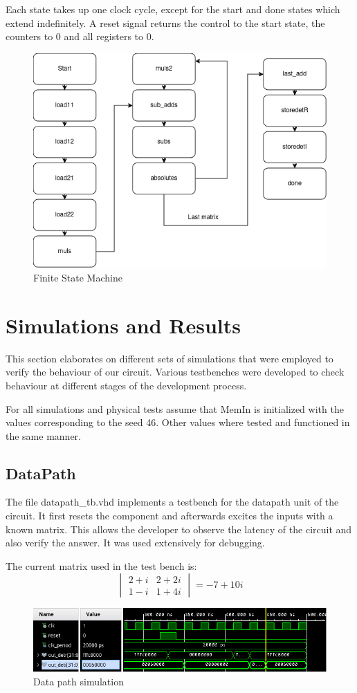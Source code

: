 \documentclass[12pt]{article}
\begin{document}
Each state takes up one clock cycle, except for the start and done states which extend indefinitely. A reset signal returns the control to the start state, the counters to 0 and all registers to 0.
\begin{figure}[H]
	\centering
	\includegraphics[width=0.55\linewidth]{images/FSM_lab3.png}
	\caption{Finite State Machine}
	\label{fig:fsm}
\end{figure}


\section{Simulations and Results}
This section elaborates on different sets of simulations that were employed to verify the behaviour of our circuit. Various testbenches were developed to check behaviour at different stages of the development process.

For all simulations and physical tests assume that MemIn is initialized with the values corresponding to the seed 46. Other values where tested and functioned in the same manner.
\subsection{DataPath}
The file datapath\_tb.vhd implements a testbench for the datapath unit of the circuit. 
It first resets the component and afterwards excites the inputs with a known matrix. This allows the developer to observe the latency of the circuit and also verify the answer. It was used extensively for debugging. 

The current matrix used in the test bench is:
\begin{equation*}
	\begin{vmatrix} 2+i & 2+2i \\ 
					1-i & 1+4i 
	\end{vmatrix} 
	= -7 + 10i
\end{equation*}

\begin{figure}[!htp]
	\centering
	\includegraphics[width=0.5\linewidth]{images/simDataPath.png}
	\caption{Data path simulation}
	\label{fig:simData}
\end{figure}
\end{document}
